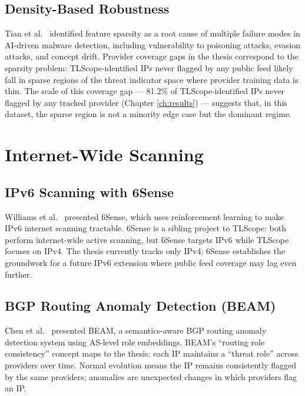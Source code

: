 \documentclass[12pt, a4paper, twoside]{report}
\begin{document}
\subsection{Density-Based Robustness}

Tian et al.\ \cite{tian2025density} identified feature sparsity as a root cause of multiple
failure modes in AI-driven malware detection, including vulnerability to poisoning attacks, evasion
attacks, and concept drift. Provider coverage gaps in the thesis correspond to the sparsity
problem: TLScope-identified IPs never flagged by any public feed likely fall in sparse regions
of the threat indicator space where provider training data is thin. The scale of this coverage gap
--- 81.2\% of TLScope-identified IPs never flagged by any tracked provider (Chapter
\ref{ch:results}) --- suggests that, in this dataset, the sparse region is not a minority edge
case but the dominant regime.

\section{Internet-Wide Scanning}

\subsection{IPv6 Scanning with 6Sense}

Williams et al.\ \cite{williams2024sixsense} presented 6Sense, which uses reinforcement learning
to make IPv6 internet scanning tractable. 6Sense is a sibling project to TLScope: both perform
internet-wide active scanning, but 6Sense targets IPv6 while TLScope focuses on IPv4. The thesis
currently tracks only IPv4; 6Sense establishes the groundwork for a future IPv6 extension where
public feed coverage may lag even further.

\subsection{BGP Routing Anomaly Detection (BEAM)}

Chen et al.\ \cite{chen2024beam} presented BEAM, a semantics-aware BGP routing anomaly detection
system using AS-level role embeddings. BEAM's ``routing role consistency'' concept maps to the
thesis: each IP maintains a ``threat role'' across providers over time. Normal evolution means the
IP remains consistently flagged by the same providers; anomalies are unexpected changes in which
providers flag an IP.
\end{document}
